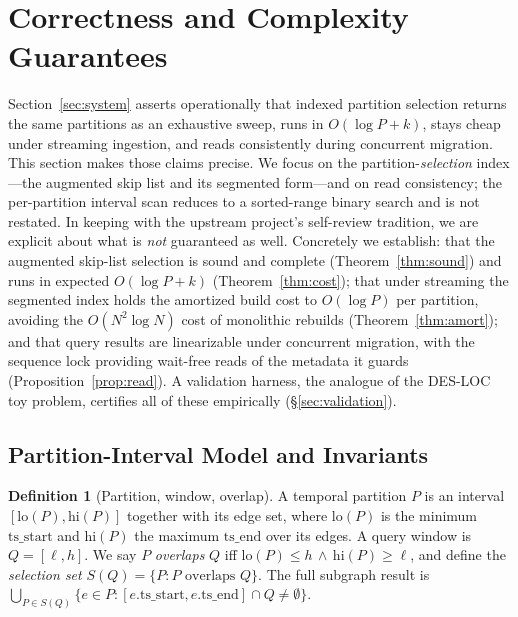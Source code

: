 \documentclass[10pt]{article}
\theoremstyle{definition}
\newtheorem{definition}{Definition}
\begin{document}
\section{Correctness and Complexity Guarantees}
\label{sec:guarantees}

Section~\ref{sec:system} asserts operationally that indexed partition selection
returns the same partitions as an exhaustive sweep, runs in $O(\log P + k)$, stays
cheap under streaming ingestion, and reads consistently during concurrent
migration. This section makes those claims precise. We focus on the
partition-\emph{selection} index---the augmented skip list and its segmented
form---and on read consistency; the per-partition interval scan reduces to a
sorted-range binary search and is not restated. In keeping with the upstream
project's self-review tradition, we are explicit about what is \emph{not}
guaranteed as well. Concretely we establish: that the augmented skip-list
selection is sound and complete (Theorem~\ref{thm:sound}) and runs in expected
$O(\log P + k)$ (Theorem~\ref{thm:cost}); that under streaming the segmented index
holds the amortized build cost to $O(\log P)$ per partition, avoiding the
$O(N^2\log N)$ cost of monolithic rebuilds (Theorem~\ref{thm:amort}); and that
query results are linearizable under concurrent migration, with the sequence lock
providing wait-free reads of the metadata it guards (Proposition~\ref{prop:read}).
A validation harness, the analogue of the DES-LOC toy problem, certifies all of
these empirically (\S\ref{sec:validation}).

\subsection{Partition-Interval Model and Invariants}
\label{sec:model}

\begin{definition}[Partition, window, overlap]
A temporal partition $P$ is an interval $[\mathrm{lo}(P),\mathrm{hi}(P)]$ together
with its edge set, where $\mathrm{lo}(P)$ is the minimum $\mathrm{ts\_start}$ and
$\mathrm{hi}(P)$ the maximum $\mathrm{ts\_end}$ over its edges. A query window is
$Q=[\ell,h]$. We say $P$ \emph{overlaps} $Q$ iff
$\mathrm{lo}(P)\le h \,\wedge\, \mathrm{hi}(P)\ge \ell$, and define the
\emph{selection set} $S(Q)=\{P: P \text{ overlaps } Q\}$. The full subgraph result
is $\bigcup_{P\in S(Q)}\{e\in P : [e.\mathrm{ts\_start}, e.\mathrm{ts\_end}]\cap Q \neq \emptyset\}$.
\end{definition}
\end{document}
